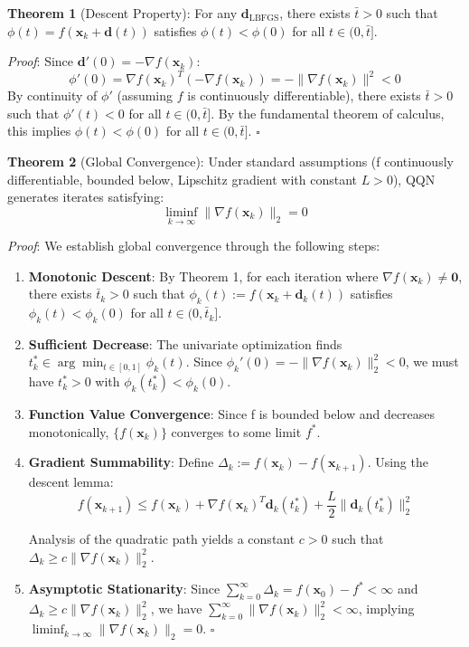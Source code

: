 \textbf{Theorem 1} (Descent Property): For any \(\mathbf{d}_{\text{LBFGS}}\), there exists \(\bar{t} > 0\) such that \(\phi(t) = f(\mathbf{x}_k + \mathbf{d}(t))\) satisfies \(\phi(t) < \phi(0)\) for all \(t \in (0, \bar{t}]\).

\emph{Proof}: Since \(\mathbf{d}'(0) = -\nabla f(\mathbf{x}_k)\):
\[\phi'(0) = \nabla f(\mathbf{x}_k)^T (-\nabla f(\mathbf{x}_k)) = -\|\nabla f(\mathbf{x}_k)\|^2 < 0\]
By continuity of \(\phi'\) (assuming \(f\) is continuously differentiable), there exists \(\bar{t} > 0\) such that \(\phi'(t) < 0\) for all \(t \in (0, \bar{t}]\). By the fundamental theorem of calculus, this implies \(\phi(t) < \phi(0)\) for all \(t \in (0, \bar{t}]\). \(\square\)

\textbf{Theorem 2} (Global Convergence): Under standard assumptions (f continuously differentiable, bounded below, Lipschitz gradient with constant \(L > 0\)), QQN generates iterates satisfying:
\[\liminf_{k \to \infty} \|\nabla f(\mathbf{x}_k)\|_2 = 0\]

\emph{Proof}: We establish global convergence through the following steps:

\begin{enumerate}
\def\labelenumi{\arabic{enumi}.}
\item
  \textbf{Monotonic Descent}: By Theorem 1, for each iteration where \(\nabla f(\mathbf{x}_k) \neq \mathbf{0}\), there exists \(\bar{t}_k > 0\) such that \(\phi_k(t) := f(\mathbf{x}_k + \mathbf{d}_k(t))\) satisfies \(\phi_k(t) < \phi_k(0)\) for all \(t \in (0, \bar{t}_k]\).
\item
  \textbf{Sufficient Decrease}: The univariate optimization finds \(t_k^* \in \arg\min_{t \in [0,1]} \phi_k(t)\).
  Since \(\phi_k'(0) = -\|\nabla f(\mathbf{x}_k)\|_2^2 < 0\), we must have \(t_k^* > 0\) with \(\phi_k(t_k^*) < \phi_k(0)\).
\item
  \textbf{Function Value Convergence}: Since f is bounded below and decreases monotonically, \(\{f(\mathbf{x}_k)\}\) converges to some limit \(f^*\).
\item
  \textbf{Gradient Summability}: Define \(\Delta_k := f(\mathbf{x}_k) - f(\mathbf{x}_{k+1})\). Using the descent lemma:
  \[f(\mathbf{x}_{k+1}) \leq f(\mathbf{x}_k) + \nabla f(\mathbf{x}_k)^T \mathbf{d}_k(t_k^*) + \frac{L}{2}\|\mathbf{d}_k(t_k^*)\|_2^2\]

  Analysis of the quadratic path yields a constant \(c > 0\) such that \(\Delta_k \geq c\|\nabla f(\mathbf{x}_k)\|_2^2\).
\item
  \textbf{Asymptotic Stationarity}: Since \(\sum_{k=0}^{\infty} \Delta_k = f(\mathbf{x}_0) - f^* < \infty\) and
  \(\Delta_k \geq c\|\nabla f(\mathbf{x}_k)\|_2^2\), we have \(\sum_{k=0}^{\infty} \|\nabla f(\mathbf{x}_k)\|_2^2 < \infty\),
  implying \(\liminf_{k \to \infty} \|\nabla f(\mathbf{x}_k)\|_2 = 0\). \(\square\)
\end{enumerate}

